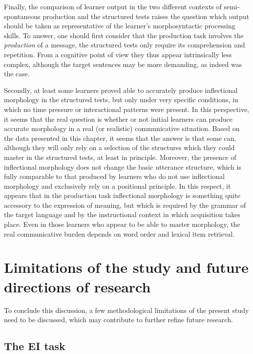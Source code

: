 Finally, the comparison of learner output in the two different contexts of semi-spontaneous  production and the structured tests raises the question which output should be taken as representative of the learner's morphosyntactic processing skills. To answer, one should first consider that the production task involves the \textit{production} of a message, the structured tests only require its comprehension and repetition. From a cognitive point of view they thus appear intrinsically less complex, although the target sentences may be more demanding, as indeed was the case. 

Secondly, at least some learners proved able to accurately produce inflectional morphology in the structured tests, but only under very specific conditions, in which no time pressure or interactional patterns were present. In this perspective, it seems that the real question is whether or not initial learners can produce accurate morphology in a real (or realistic) communicative situation. Based on the data presented in this chapter, it seems that the answer is that some can, although they will only rely on a selection of the structures which they could master in the structured tests, at least in principle. Moreover, the presence of inflectional morphology does not change the basic utterance structure, which is fully comparable to that produced by learners who do not use inflectional morphology and exclusively rely on a positional principle. In this respect, it appears that in the production task inflectional morphology is something quite accessory to the expression of meaning, but which is required by the grammar of the target language and by the instructional context in which acquisition takes place. Even in those learners who appear to be able to master morphology, the real communicative burden depends on word order and lexical item retrieval.

\section{Limitations of the study and future directions of research}\label{sec:08:6}

To conclude this discussion, a few methodological limitations of the present study need to be discussed, which may contribute to further refine future research. 

\subsection{The EI task}\label{sec:08:6.1}


